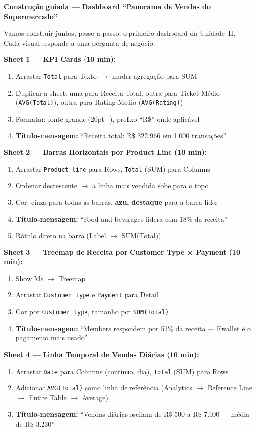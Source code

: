 \begin{SolvedBox}
\textbf{Construção guiada — Dashboard ``Panorama de Vendas do Supermercado''}

Vamos construir juntos, passo a passo, o primeiro dashboard
da Unidade~II. Cada visual responde a uma pergunta de negócio.

\textbf{Sheet 1 — KPI Cards (10 min):}
\begin{enumerate}
  \item Arrastar \texttt{Total} para Texto $\to$ mudar agregação para SUM
  \item Duplicar a sheet: uma para Receita Total, outra para
  Ticket Médio (\texttt{AVG(Total)}), outra para Rating Médio (\texttt{AVG(Rating)})
  \item Formatar: fonte grande (20pt+), prefixo ``R\$'' onde aplicável
  \item \textbf{Título-mensagem:} ``Receita total: R\$ 322.966 em 1.000 transações''
\end{enumerate}

\textbf{Sheet 2 — Barras Horizontais por Product Line (10 min):}
\begin{enumerate}
  \item Arrastar \texttt{Product line} para Rows, \texttt{Total} (SUM)
  para Columns
  \item Ordenar decrescente $\to$ a linha mais vendida sobe para o topo
  \item Cor: cinza para todas as barras, \textbf{azul destaque} para
  a barra líder
  \item \textbf{Título-mensagem:}
  ``Food and beverages lidera com 18\% da receita''
  \item Rótulo direto na barra (Label $\to$ SUM(Total))
\end{enumerate}

\textbf{Sheet 3 — Treemap de Receita por Customer Type × Payment (10 min):}
\begin{enumerate}
  \item Show Me $\to$ Treemap
  \item Arrastar \texttt{Customer type} e \texttt{Payment} para Detail
  \item Cor por \texttt{Customer type}, tamanho por \texttt{SUM(Total)}
  \item \textbf{Título-mensagem:}
  ``Members respondem por 51\% da receita — Ewallet é o pagamento mais usado''
\end{enumerate}

\textbf{Sheet 4 — Linha Temporal de Vendas Diárias (10 min):}
\begin{enumerate}
  \item Arrastar \texttt{Date} para Columns (contínuo, dia),
  \texttt{Total} (SUM) para Rows
  \item Adicionar \texttt{AVG(Total)} como linha de referência
  (Analytics $\to$ Reference Line $\to$ Entire Table $\to$ Average)
  \item \textbf{Título-mensagem:}
  ``Vendas diárias oscilam de R\$ 500 a R\$ 7.000 — média de R\$ 3.230''
\end{enumerate}


\end{SolvedBox}
